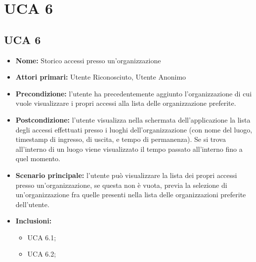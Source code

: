 \section{UCA 6}
\subsection{UCA 6}
\begin{itemize}
    \item \textbf{Nome:} Storico accessi presso un'organizzazione
    \item \textbf{Attori primari:} Utente Riconosciuto, Utente Anonimo
    \item \textbf{Precondizione:} l’utente ha precedentemente aggiunto l’organizzazione di cui vuole visualizzare i propri accessi alla lista delle organizzazione preferite.
    \item \textbf{Postcondizione:} l’utente visualizza nella schermata dell’applicazione la lista degli accessi effettuati presso i luoghi dell’organizzazione (con nome del luogo, timestamp di ingresso, di uscita, e tempo di permanenza).
    Se si trova all'interno di un luogo viene visualizzato il tempo passato all'interno fino a quel momento.
    \item \textbf{Scenario principale:} l'utente può visualizzare la lista dei propri accessi presso un'organizzazione, se questa non è vuota, previa la selezione di un'organizzazione fra quelle presenti nella lista delle organizzazioni preferite dell'utente.
    \item \textbf{Inclusioni:}
    \begin{itemize}
        \item UCA 6.1;
        \item UCA 6.2;
    \end{itemize}
\end{itemize}

